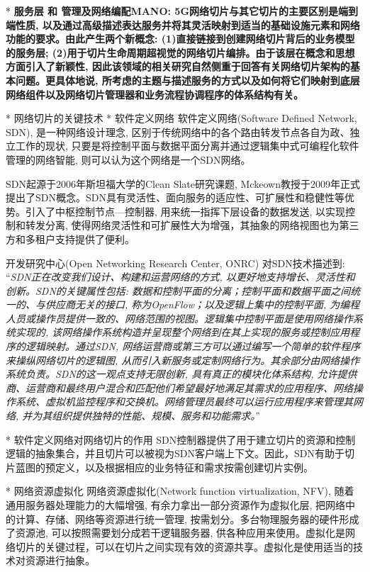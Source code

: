     * \bf{服务层 和 管理及网络编配MANO}: 5G网络切片与其它切片的主要区别是端到端性质, 以及通过高级描述表达服务并将其灵活映射到适当的基础设施元素和网络功能的要求。由此产生两个新概念: (1)直接链接到创建网络切片背后的业务模型的服务层; (2)用于切片生命周期超视觉的网络切片编排。由于该层在概念和思想方面引入了新颖性, 因此该领域的相关研究自然侧重于回答有关网络切片架构的基本问题。更具体地说, 所考虑的主题与描述服务的方式以及如何将它们映射到底层网络组件以及网络切片管理器和业务流程协调程序的体系结构有关。
    

    
* 网络切片的关键技术
    * 软件定义网络
        软件定义网络(Software Defined Network, SDN), 是一种网络设计理念, 区别于传统网络中的各个路由转发节点各自为政、独立工作的现状, 只要是将控制平面与数据平面分离并通过逻辑集中式可编程化软件管理的网络智能, 则可以认为这个网络是一个SDN网络。
        
        SDN起源于2006年斯坦福大学的Clean Slate研究课题, Mckeown教授于2009年正式提出了SDN概念。SDN具有灵活性、面向服务的适应性、可扩展性和稳健性等优势。引入了中枢控制节点---控制器, 用来统一指挥下层设备的数据发送, 以实现控制和转发分离, 使得网络灵活性和可扩展性大为增强，其抽象的网络视图也为第三方和多租户支持提供了便利。

        开发研究中心(Open Networking Research Center, ONRC) 对SDN技术描述到:  “\textit{SDN正在改变我们设计、构建和运营网络的方式, 以更好地支持增长、灵活性和创新。SDN的关键属性包括: 数据和控制平面的分离；控制平面和数据平面之间统一的、与供应商无关的接口, 称为OpenFlow；以及逻辑上集中的控制平面, 为编程人员或操作员提供一致的、网络范围的视图。逻辑集中控制平面是使用网络操作系统实现的, 该网络操作系统构造并呈现整个网络到在其上实现的服务或控制应用程序的逻辑映射。通过SDN, 网络运营商或第三方可以通过编写一个简单的软件程序来操纵网络切片的逻辑图, 从而引入新服务或定制网络行为。其余部分由网络操作系统负责。SDN的这一观点支持无限创新, 具有真正的模块化体系结构, 允许提供商、运营商和最终用户混合和匹配他们希望最好地满足其需求的应用程序、网络操作系统、虚拟机监控程序和交换机。网络管理员最终可以运行应用程序来管理其网络, 并为其组织提供独特的性能、规模、服务和功能需求。}”

        * 软件定义网络对网络切片的作用
            SDN控制器提供了用于建立切片的资源和控制逻辑的抽象集合，并且切片可以被视为SDN客户端上下文。因此，SDN有助于切片蓝图的预定义，以及根据相应的业务特征和需求按需创建切片实例。
    
    * 网络资源虚拟化
        网络资源虚拟化(Network function virtualization, NFV), 随着通用服务器处理能力的大幅增强, 有余力拿出一部分资源作为虚拟化层, 把网络中的计算、存储、网络等资源进行统一管理, 按需划分。多台物理服务器的硬件形成了资源池, 可以按照需要划分成若干逻辑服务器, 供各种应用来使用。虚拟化是网络切片的关键过程，可以在切片之间实现有效的资源共享。虚拟化是使用适当的技术对资源进行抽象。

